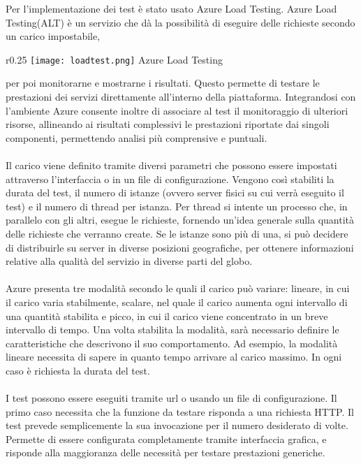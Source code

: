 Per l'implementazione dei test è stato usato Azure Load Testing.
Azure Load Testing(ALT) è un servizio che dà la possibilità
di eseguire delle richieste secondo un carico impostabile,
\begin{wrapfigure}{r}{0.25\textwidth}
    \centering
    \texttt{[image: loadtest.png]}
    Azure Load Testing
\end{wrapfigure}
per poi monitorarne e mostrarne i risultati.
Questo permette di testare le prestazioni dei servizi direttamente all'interno della piattaforma.
Integrandosi con l'ambiente Azure
consente inoltre di associare al test il monitoraggio di ulteriori risorse,  
allineando ai risultati complessivi le prestazioni riportate dai singoli componenti, 
permettendo analisi più comprensive e puntuali.\\
\\
Il carico viene definito tramite diversi parametri che possono essere impostati 
attraverso l'interfaccia o in un file di configurazione.
Vengono così stabiliti la durata del test, il numero di istanze (ovvero server fisici su cui verrà eseguito il test)
e il numero di thread per istanza.
Per thread si intente un processo che, in parallelo con gli altri, 
esegue le richieste, 
fornendo un'idea generale sulla quantità delle richieste che verranno create.
Se le istanze sono più di una,
si può decidere di distribuirle su server in diverse posizioni geografiche,
per ottenere informazioni relative alla qualità del servizio in diverse parti del globo.\\
\\
Azure presenta tre modalità secondo le quali il carico può variare: 
lineare, in cui il carico varia stabilmente, 
scalare, nel quale il carico aumenta ogni intervallo di una quantità stabilita e
picco, in cui il carico viene concentrato in un breve intervallo di tempo.
Una volta stabilita la modalità, sarà necessario definire le caratteristiche 
che descrivono il suo comportamento. 
Ad esempio, la modalità lineare necessita di sapere in quanto tempo arrivare al carico massimo.
In ogni caso è richiesta la durata del test.\\
\\
I test possono essere eseguiti tramite url o usando un file di configurazione.
Il primo caso necessita che la funzione da testare risponda a una richiesta HTTP.
Il test prevede semplicemente la sua invocazione per il numero desiderato di volte.
Permette di essere configurata completamente tramite interfaccia grafica,
e risponde alla maggioranza delle necessità per testare prestazioni generiche.
